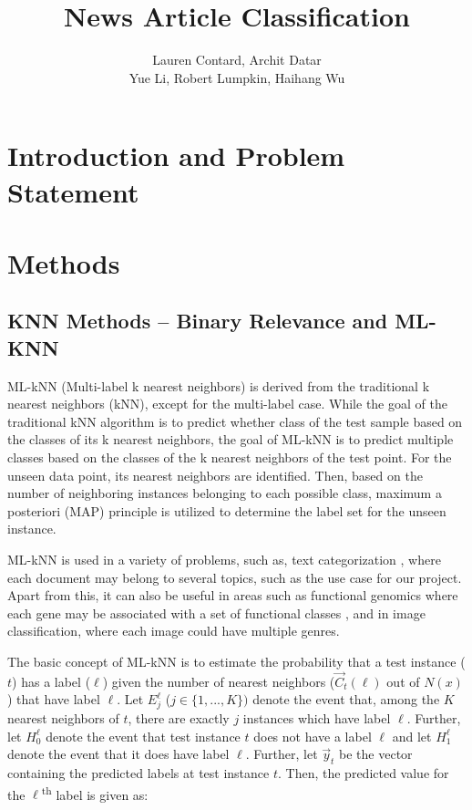 \documentclass[11pt]{article}
\title{\Huge News Article Classification}
\author{Lauren Contard, Archit Datar \\ 
Yue Li, Robert Lumpkin, Haihang Wu}
\date{}
\begin{document}
\begin{singlespace}
    \maketitle
\end{singlespace}


\section{Introduction and Problem Statement}

\section{Methods}

\subsection{KNN Methods -- Binary Relevance and ML-KNN}
ML-kNN (Multi-label k nearest neighbors) is derived from the traditional k nearest neighbors (kNN), except for the multi-label case. While the goal of the traditional kNN algorithm is to predict whether class of the test sample based on the classes of its k nearest neighbors, the goal of ML-kNN is to predict multiple classes based on the classes of the k nearest neighbors of the test point. For the unseen data point, its nearest neighbors are identified. Then, based on the number of neighboring instances belonging to each possible class, maximum a posteriori (MAP) principle is utilized to determine the label set for the unseen instance. 

ML-kNN is used in a variety of problems, such as, text categorization \autocite{McCallum99multi-labeltext}, where each document may belong to several topics, such as the use case for our project. Apart from this, it can also be useful in areas such as functional genomics where each gene may be associated with a set of functional classes \autocite{KernelMulti-labelClassification}, and in image classification, where each image could have multiple genres.\autocite{Boutell04learningmulti-label}  

The basic concept of ML-kNN is to estimate the probability that a test instance ($t$) has a label ($\ell$) given the number of nearest neighbors ($\vec{C}_t(\ell)$ out of $N(x)$) that have label $\ell$. Let $E_j^\ell$ ($j \in \{1,...,K\})$ denote the event that, among the $K$ nearest neighbors of $t$, there are exactly $j$ instances which have label $\ell$. Further, let $H_0^\ell$ denote the event that test instance $t$ does not have a label $\ell$ and let $H_1^\ell$ denote the event that it does have label $\ell$. 
Further, let $\vec{y}_t$ be the vector containing the predicted labels at test instance $t$. Then, the predicted value for the $\ell$\textsuperscript{th} label is given as:
\end{document}
